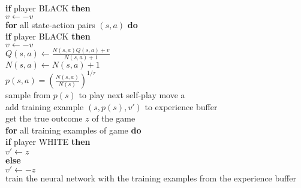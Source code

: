 \documentclass{article}
\begin{document}
\indent \indent \indent \indent \indent \textbf{if} player BLACK \textbf{then} \\
\indent \indent \indent \indent \indent \indent $v \leftarrow -v$ \\
\indent \indent \indent \indent \textbf{for} all state-action pairs $(s,a)$ \textbf{do} \\
\indent \indent \indent \indent \indent \textbf{if} player BLACK \textbf{then} \\
\indent \indent \indent \indent \indent \indent $v \leftarrow -v$ \\
\indent \indent \indent \indent \indent $Q(s,a) \leftarrow \frac{N(s,a) Q(s,a) + v}{N(s,a) + 1}$ \\
\indent \indent \indent \indent \indent $N(s,a) \leftarrow N(s,a) + 1$ \\
\indent \indent $p(s,a) = \left( \frac{N(s,a)}{N(s)} \right)^{1/\tau}$ \\
\indent \indent sample from $p(s)$ to play next self-play move a \\
\indent \indent add training example $(s, p(s), v')$ to experience buffer \\
\indent \indent get the true outcome $z$ of the game \\
\indent \indent \textbf{for} all training examples of game \textbf{do} \\
\indent \indent \indent \textbf{if} player WHITE \textbf{then} \\
\indent \indent \indent \indent $v' \leftarrow z$ \\
\indent \indent \indent \textbf{else} \\
\indent \indent \indent \indent $v' \leftarrow -z$ \\ 
\indent train the neural network with the training examples from the experience buffer \\


\pagebreak
\end{document}
